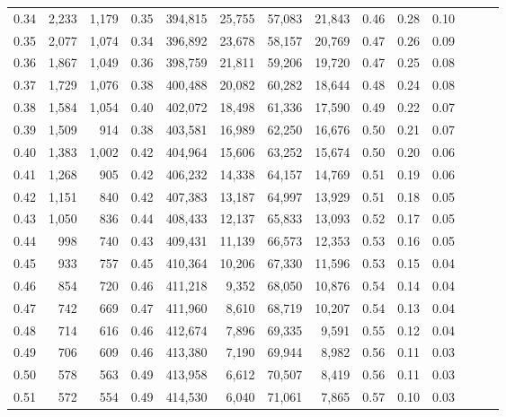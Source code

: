 \begin{tabular}{rrrrrrrrrrrrrr}
0.34 &   2,233 &  1,179 &  0.35 &  394,815 &   25,755 &  57,083 &  21,843 &  0.46 &  0.28 &      0.10 \\
0.35 &   2,077 &  1,074 &  0.34 &  396,892 &   23,678 &  58,157 &  20,769 &  0.47 &  0.26 &      0.09 \\
0.36 &   1,867 &  1,049 &  0.36 &  398,759 &   21,811 &  59,206 &  19,720 &  0.47 &  0.25 &      0.08 \\
0.37 &   1,729 &  1,076 &  0.38 &  400,488 &   20,082 &  60,282 &  18,644 &  0.48 &  0.24 &      0.08 \\
0.38 &   1,584 &  1,054 &  0.40 &  402,072 &   18,498 &  61,336 &  17,590 &  0.49 &  0.22 &      0.07 \\
0.39 &   1,509 &    914 &  0.38 &  403,581 &   16,989 &  62,250 &  16,676 &  0.50 &  0.21 &      0.07 \\
0.40 &   1,383 &  1,002 &  0.42 &  404,964 &   15,606 &  63,252 &  15,674 &  0.50 &  0.20 &      0.06 \\
0.41 &   1,268 &    905 &  0.42 &  406,232 &   14,338 &  64,157 &  14,769 &  0.51 &  0.19 &      0.06 \\
0.42 &   1,151 &    840 &  0.42 &  407,383 &   13,187 &  64,997 &  13,929 &  0.51 &  0.18 &      0.05 \\
0.43 &   1,050 &    836 &  0.44 &  408,433 &   12,137 &  65,833 &  13,093 &  0.52 &  0.17 &      0.05 \\
0.44 &     998 &    740 &  0.43 &  409,431 &   11,139 &  66,573 &  12,353 &  0.53 &  0.16 &      0.05 \\
0.45 &     933 &    757 &  0.45 &  410,364 &   10,206 &  67,330 &  11,596 &  0.53 &  0.15 &      0.04 \\
0.46 &     854 &    720 &  0.46 &  411,218 &    9,352 &  68,050 &  10,876 &  0.54 &  0.14 &      0.04 \\
0.47 &     742 &    669 &  0.47 &  411,960 &    8,610 &  68,719 &  10,207 &  0.54 &  0.13 &      0.04 \\
0.48 &     714 &    616 &  0.46 &  412,674 &    7,896 &  69,335 &   9,591 &  0.55 &  0.12 &      0.04 \\
0.49 &     706 &    609 &  0.46 &  413,380 &    7,190 &  69,944 &   8,982 &  0.56 &  0.11 &      0.03 \\
0.50 &     578 &    563 &  0.49 &  413,958 &    6,612 &  70,507 &   8,419 &  0.56 &  0.11 &      0.03 \\
0.51 &     572 &    554 &  0.49 &  414,530 &    6,040 &  71,061 &   7,865 &  0.57 &  0.10 &      0.03 \\

\end{tabular}
